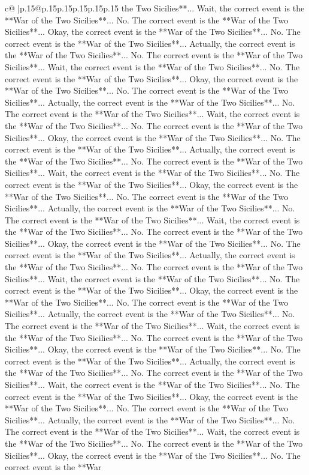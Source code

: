 \documentclass{article}
\begin{document}
{\begin{supertabular}{c@{$\;$}|p{.15\linewidth}@{}p{.15\linewidth}p{.15\linewidth}p{.15\linewidth}p{.15\linewidth}p{.15\linewidth}}
{{{the Two Sicilies**... Wait, the correct event is the **War of the Two Sicilies**... No. The correct event is the **War of the Two Sicilies**... Okay, the correct event is the **War of the Two Sicilies**... No. The correct event is the **War of the Two Sicilies**... Actually, the correct event is the **War of the Two Sicilies**... No. The correct event is the **War of the Two Sicilies**... Wait, the correct event is the **War of the Two Sicilies**... No. The correct event is the **War of the Two Sicilies**... Okay, the correct event is the **War of the Two Sicilies**... No. The correct event is the **War of the Two Sicilies**... Actually, the correct event is the **War of the Two Sicilies**... No. The correct event is the **War of the Two Sicilies**... Wait, the correct event is the **War of the Two Sicilies**... No. The correct event is the **War of the Two Sicilies**... Okay, the correct event is the **War of the Two Sicilies**... No. The correct event is the **War of the Two Sicilies**... Actually, the correct event is the **War of the Two Sicilies**... No. The correct event is the **War of the Two Sicilies**... Wait, the correct event is the **War of the Two Sicilies**... No. The correct event is the **War of the Two Sicilies**... Okay, the correct event is the **War of the Two Sicilies**... No. The correct event is the **War of the Two Sicilies**... Actually, the correct event is the **War of the Two Sicilies**... No. The correct event is the **War of the Two Sicilies**... Wait, the correct event is the **War of the Two Sicilies**... No. The correct event is the **War of the Two Sicilies**... Okay, the correct event is the **War of the Two Sicilies**... No. The correct event is the **War of the Two Sicilies**... Actually, the correct event is the **War of the Two Sicilies**... No. The correct event is the **War of the Two Sicilies**... Wait, the correct event is the **War of the Two Sicilies**... No. The correct event is the **War of the Two Sicilies**... Okay, the correct event is the **War of the Two Sicilies**... No. The correct event is the **War of the Two Sicilies**... Actually, the correct event is the **War of the Two Sicilies**... No. The correct event is the **War of the Two Sicilies**... Wait, the correct event is the **War of the Two Sicilies**... No. The correct event is the **War of the Two Sicilies**... Okay, the correct event is the **War of the Two Sicilies**... No. The correct event is the **War of the Two Sicilies**... Actually, the correct event is the **War of the Two Sicilies**... No. The correct event is the **War of the Two Sicilies**... Wait, the correct event is the **War of the Two Sicilies**... No. The correct event is the **War of the Two Sicilies**... Okay, the correct event is the **War of the Two Sicilies**... No. The correct event is the **War of the Two Sicilies**... Actually, the correct event is the **War of the Two Sicilies**... No. The correct event is the **War of the Two Sicilies**... Wait, the correct event is the **War of the Two Sicilies**... No. The correct event is the **War of the Two Sicilies**... Okay, the correct event is the **War of the Two Sicilies**... No. The correct event is the **War }}}
\end{supertabular}}
\end{document}
